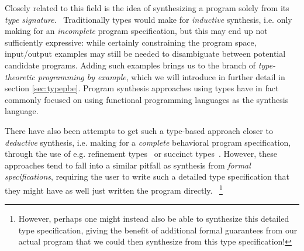 \documentclass{article}
\begin{document}
Closely related to this field is the idea of synthesizing a program solely from its \emph{type signature}.~\citep{djinn,synquid}
Traditionally types would make for \emph{inductive} synthesis,
i.e. only making for an \emph{incomplete} program specification,
but this may end up not sufficiently expressive:
while certainly constraining the program space,
input/output examples may still be needed to disambiguate between potential candidate programs.
Adding such examples brings us to the branch of \emph{type-theoretic programming by example},
which we will introduce in further detail in section \ref{sec:typepbe}.
Program synthesis approaches using types have in fact commonly focused on using functional programming languages as the synthesis language.%
~\citep{synquid,eguchi2018automated,scythe,scout,gissurarson2018suggesting,idris,lenses}

There have also been attempts to get such a type-based approach closer to \emph{deductive} synthesis,
i.e. making for a \emph{complete} behavioral program specification,
through the use of e.g. refinement types~\citep{synquid} or succinct types~\citep{guospeeding}.
However, these approaches tend to fall into a similar pitfall as synthesis from \emph{formal specifications},
requiring the user to write such a detailed type specification that they might have as well just written the program directly.%
~\footnote{
    However, perhaps one might instead also be able to synthesize this detailed type specification,
    giving the benefit of additional formal guarantees from our actual program that we could then synthesize from this type specification!
}


\end{document}
